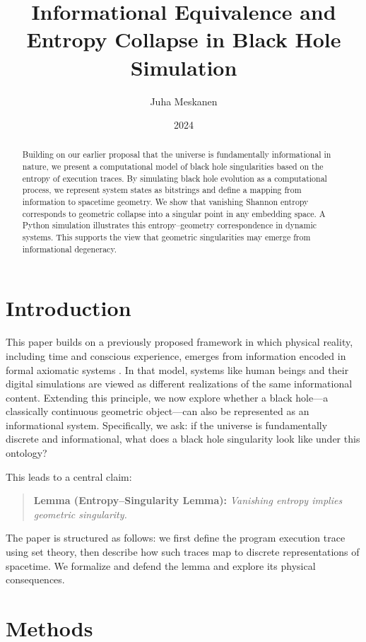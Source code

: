 \documentclass[11pt]{article}
\title{Informational Equivalence and Entropy Collapse in Black Hole Simulation}
\author{Juha Meskanen}
\date{2024}
\begin{document}
\maketitle


\begin{abstract}
  Building on our earlier proposal that the universe is fundamentally informational in nature, we present a computational model of black hole singularities based on the entropy of execution traces. By simulating black hole evolution as a computational process, we represent system states as bitstrings and define a mapping from information to spacetime geometry. We show that vanishing Shannon entropy corresponds to geometric collapse into a singular point in any embedding space. A Python simulation illustrates this entropy–geometry correspondence in dynamic systems. This supports the view that geometric singularities may emerge from informational degeneracy.
\end{abstract}

\section{Introduction}

This paper builds on a previously proposed framework in which physical reality, including time and conscious experience, emerges from information encoded in formal axiomatic systems \cite{meskanen2019}. In that model, systems like human beings and their digital simulations are viewed as different realizations of the same informational content. Extending this principle, we now explore whether a black hole—a classically continuous geometric object—can also be represented as an informational system. Specifically, we ask: if the universe is fundamentally discrete and informational, what does a black hole singularity look like under this ontology?


This leads to a central claim:

\begin{quote}
  \textbf{Lemma (Entropy--Singularity Lemma):} \emph{Vanishing entropy implies geometric singularity.}
\end{quote}

The paper is structured as follows: we first define the program execution trace using set theory, then describe how such traces map to discrete representations of spacetime. We formalize and defend the lemma and explore its physical consequences.

\section{Methods}
\end{document}

